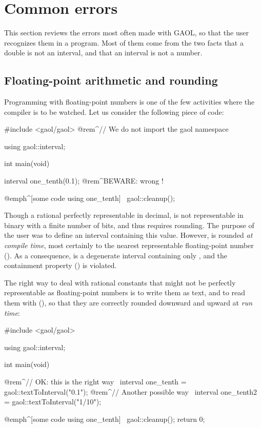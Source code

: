 \documentclass[12pt,a4paper,twoside,openright]{book}
\begin{document}
\section{Common errors}\label{sec:common-errors}
%

This section reviews the errors most often made with GAOL, so that the user
recognizes them in a program. Most of them come from the two facts that a
double is not an interval, and that an interval is not a number.

\subsection{Floating-point arithmetic and rounding}
%

Programming with floating-point numbers is one of the few activities where
the compiler is to be watched. Let us consider the following piece of code:

\begin{example}
#include <gaol/gaol>  @rem^// We do not import the gaol namespace~

using gaol::interval;

int main(void) {
  interval one_tenth(0.1); @rem^BEWARE: wrong !~

  @emph^[some code using one_tenth]~
  gaol::cleanup();
}
\end{example}

\noindent
Though a rational perfectly representable in decimal,  is not
representable in binary with a finite number of bits, and thus requires
rounding. The purpose of the user was to define an interval containing this
value. However,  is rounded \emph{at compile time}, most certainly
to the nearest representable floating-point number 
(). As a consequence,  is a
degenerate interval containing only , and the containment
property () is violated.

The right way to deal with rational constants that might not be perfectly
representable as floating-point numbers is to write them as text, and to read
them with  (), so that
they are correctly rounded downward and upward at \emph{run time}:

\begin{example}
#include <gaol/gaol>

using gaol::interval;

int main(void)
{
  @rem^// OK: this is the right way~
  interval one_tenth = gaol::textToInterval("0.1");
  @rem^// Another possible way~
  interval one_tenth2 = gaol::textToInterval("1/10");

  @emph^[some code using one_tenth]~
  gaol::cleanup();
  return 0;
}
\end{example}
\end{document}
